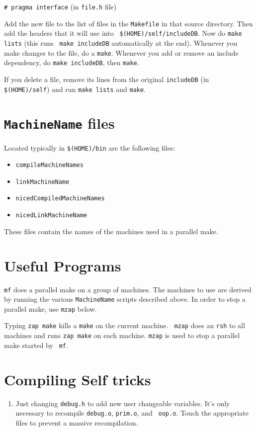 	{\tt \# pragma interface}  (in {\tt file.h} file)
\eq

Add the new file to the list of files in the {\tt Makefile} in that
source directory.  Then add the headers that it will use into {\tt
\$(HOME)/self/includeDB}.  Now do {\tt make lists} (this runs {\tt
make includeDB} automatically at the end).  Whenever you make changes
to the file, do a {\tt make}.  Whenever you add or remove an include
dependency, do {\tt make includeDB}, then {\tt make}.

If you delete a file, remove its lines from the original {\tt includeDB}
(in {\tt \$(HOME)/self}) and run {\tt make lists} and {\tt make}.

\section{{\tt MachineName} files}
Located typically in {\tt \$(HOME)/bin} are the following files: 
\begin{itemize}
 \item {\tt compileMachineNames}

 \item {\tt linkMachineName}

 \item {\tt nicedCompiledMachineNames}

 \item {\tt nicedLinkMachineName}
\end{itemize}
These files contain the names of the machines used in a parallel make.

\section{Useful Programs}
\begin{description}
{\tt mf} does a parallel make on a group of machines.  The machines to
use are derived by running the various {\tt MachineName} scripts
described above.  In order to stop a parallel make, use {\tt mzap}
below.

Typing {\tt zap make} kills a {\tt make} on the current machine.  {\tt
mzap} does an {\tt rsh} to all machines and runs {\tt zap make} on each
machine.  {\tt mzap} is used to stop a parallel make started by {\tt
mf}.

\end{description}


\section{Compiling Self tricks}
\begin{enumerate}

\item
Just changing {\tt debug.h} to add new user changeable variables.
It's only necessary to recompile {\tt debug.o}, {\tt prim.o}, and {\tt
oop.o}.  Touch the appropriate files to prevent a massive
recompilation.

\end{enumerate}

